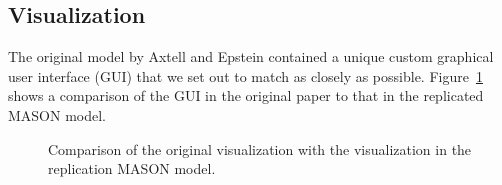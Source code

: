 \documentclass[runningheads,a4paper]{article}
\begin{document}
\subsection{Visualization}

The original model by Axtell and Epstein contained a unique custom graphical user interface (GUI) that we set out to match as closely as possible. Figure~\ref{fig:gui-comparison} shows a comparison of the GUI in the original paper to that in the replicated MASON model.

\begin{figure}
\centering
\caption{Comparison of the original visualization with the visualization in the replication MASON model. }
\label{fig:gui-comparison}
\end{figure}
\end{document}
